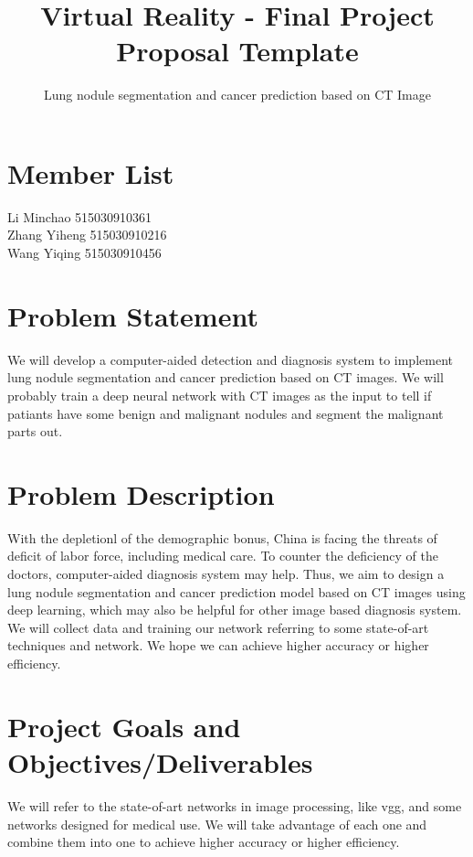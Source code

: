 \documentclass[hyperref]{article}
\theoremstyle{nonumberplain}
\begin{document}
\title{\bf Virtual Reality - Final Project Proposal Template} 
\author{\sffamily Lung nodule segmentation and cancer prediction based on CT Image\\}
\maketitle

\section{Member List}
{\noindent \large{Li Minchao \hspace{1.65cm}515030910361}\\}
{\noindent \large{\hspace{1cm} Zhang Yiheng \hspace{1.03cm} 515030910216}\\}
{\noindent \large{\hspace{1cm} Wang Yiqing  \hspace{1.2cm} 515030910456}}
\section{Problem Statement}
We will develop a computer-aided detection and diagnosis system to implement lung nodule segmentation and cancer prediction based on CT images. We will probably train a deep neural network with CT images as the input to tell if patiants have some benign and malignant nodules and segment the malignant parts out.
\section{Problem Description}
With the depletionl of the demographic bonus, China is facing the threats of deficit of labor force, including medical care. To counter the deficiency of the doctors, computer-aided diagnosis system may help. Thus, we aim to design a lung nodule segmentation and cancer prediction model based on CT images using deep learning, which may also be helpful for other image based diagnosis system. We will collect data and training our network referring to some state-of-art techniques and network. We hope we can achieve higher accuracy or higher efficiency.
\section{Project Goals and Objectives/Deliverables}
We will refer to the state-of-art networks in image processing, like vgg, and some networks designed for medical use. We will take advantage of each one and combine them into one to achieve higher accuracy or higher efficiency.
\end{document}
